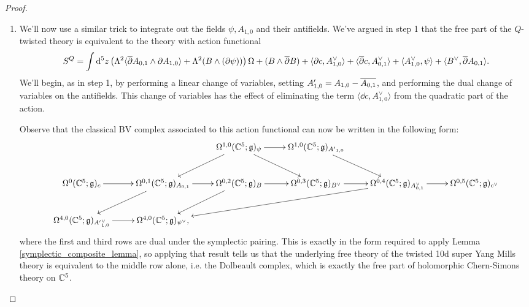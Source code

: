\documentclass[10pt, oneside]{article}
\begin{document}
\begin{proof}
\begin{enumerate}
 \item We'll now use a similar trick to integrate out the fields $\psi, A_{1,0}$ and their antifields.  We've argued in step 1 that the free part of the $Q$-twisted theory is equivalent to the theory with action functional 
 \[  S^Q = \int {\rm d}^5z \left(\Lambda^2 \langle \overline{\partial} A_{0,1} \wedge \partial A_{1,0} \rangle + \Lambda^2(B \wedge (\partial \psi))\right) \Omega + (B \wedge \overline{\partial} B) + \langle \partial c, A_{1,0}^\vee \rangle +  \langle \overline{\partial} c, A_{0,1}^\vee \rangle + \langle A_{1,0}^\vee, \psi \rangle + \langle B^\vee, \overline{\partial} A_{0,1} \rangle.\]
 We'll begin, as in step 1, by performing a linear change of variables, setting $A'_{1,0} = A_{1,0} - \overline{A_{0,1}}$, and performing the dual change of variables on the antifields.  This change of variables has the effect of eliminating the term $\langle \dd c, A_{1,0}^\vee \rangle$ from the quadratic part of the action. 
 
 Observe that the classical BV complex associated to this action functional can now be written in the following form:
 \[\xymatrix{
 &&\Omega^{1,0}(\CC^5;\gg)_\psi \ar[dl] \ar[dr] \ar[r] &\Omega^{1,0}(\CC^5;\gg)_{{A'}_{1,0}} \ar[dr]\\
 \Omega^0(\CC^5;\gg)_c \ar[r] &\Omega^{0,1}(\CC^5;\gg)_{A_{0,1}}  \ar[dl] \ar[r] &\Omega^{0,2}(\CC^5;\gg)_{B} \ar[dl]\ar[r] &\Omega^{0,3}(\CC^5;\gg)_{B^\vee} \ar[r] &\Omega^{0,4}(\CC^5;\gg)_{A_{0,1}^\vee} \ar[dlll] \ar[r] &\Omega^{0,5}(\CC^5;\gg)_{c^\vee} \\
 \Omega^{4,0}(\CC^5;\gg)_{{A'}_{1,0}^\vee} \ar[r]   &\Omega^{4,0}(\CC^5;\gg)_{\psi^\vee},
 }\]
 where the first and third rows are dual under the symplectic pairing.  This is exactly in the form required to apply Lemma \ref{symplectic_composite_lemma}, so applying that result tells us that the underlying free theory of the twisted 10d super Yang Mills theory is equivalent to the middle row alone, i.e. the Dolbeault complex, which is exactly the free part of holomorphic Chern-Simons theory on $\mathbb C^5$.
 

\end{enumerate}
\end{proof}
\end{document}
